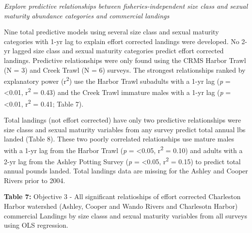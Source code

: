 \documentclass[
]{article}
\begin{document}
\emph{Explore predictive relationships between fisheries-independent
size class and sexual maturity abundance categories and commercial
landings}

Nine total predictive models using several size class and sexual
maturity categories with 1-yr lag to explain effort corrected landings
were developed. No 2-yr lagged size class and sexual maturity categories
predict effort corrected landings. Predictive relationships were only
found using the CRMS Harbor Trawl (N = 3) and Creek Trawl (N = 6)
surveys. The strongest relationships ranked by explanatory power
(r\textsuperscript{2}) use the Harbor Trawl subadults with a 1-yr lag
(\emph{p} = \textless0.01, r\textsuperscript{2} = 0.43) and the Creek
Trawl immature males with a 1-yr lag (\emph{p} = \textless0.01,
r\textsuperscript{2} = 0.41; Table 7).

Total landings (not effort corrected) have only two predictive
relationships were size classs and sexual maturity variables from any
survey predict total annual lbs landed (Table 8). These two poorly
correlated relationships use mature males with a 1-yr lag from the
Harbor Trawl (\emph{p} = \textless0.05, r\textsuperscript{2} = 0.10) and
adults with a 2-yr lag from the Ashley Potting Survey (\emph{p} =
\textless0.05, r\textsuperscript{2} = 0.15) to predict total annual
pounds landed. Total landings data are missing for the Ashley and Cooper
Rivers prior to 2004.

\textbf{Table 7:} Objective 3 - All significant relatioships of effort
corrected Charleston Harbor watershed (Ashley, Cooper and Wando Rivers
and Charlesotn Harbor) commercial Landings by size classs and sexual
maturity variables from all surveys using OLS regression.
\end{document}
